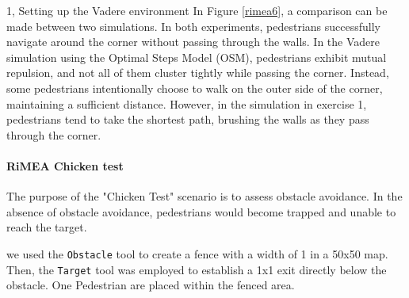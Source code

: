 \begin{task}{1, Setting up the Vadere environment}
In Figure \ref{rimea6}, a comparison can be made between two simulations. In both experiments, pedestrians successfully navigate around the corner without passing through the walls. In the Vadere simulation using the Optimal Steps Model (OSM), pedestrians exhibit mutual repulsion, and not all of them cluster tightly while passing the corner. Instead, some pedestrians intentionally choose to walk on the outer side of the corner, maintaining a sufficient distance. However, in the simulation in exercise 1, pedestrians tend to take the shortest path, brushing the walls as they pass through the corner.

\paragraph{RiMEA Chicken test}

The purpose of the "Chicken Test" scenario is to assess obstacle avoidance. In the absence of obstacle avoidance, pedestrians would become trapped and unable to reach the target.

we used the \texttt{Obstacle} tool to create a fence with a width of 1 in a 50x50 map. Then, the \texttt{Target} tool was employed to establish a 1x1 exit directly below the obstacle. One Pedestrian are placed within the fenced area.


\end{task}
